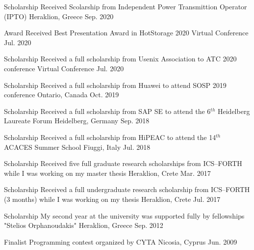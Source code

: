 \begin{cvhonors}
	\cvhonor
	{Scholarship} %
	{Received Scolarship from Independent Power Transmittion Operator
		(IPTO)} %
	{Heraklion, Greece} %
	{Sep. 2020} %

	\cvhonor
	{Award} %
	{Received Best Presentation Award in HotStorage 2020} %
	{Virtual Conference} %
	{Jul. 2020} %

	\cvhonor
	{Scholarship} %
	{Received a full scholarship from Usenix Association to ATC 2020
		conference} %
	{Virtual Conference} %
	{Jul. 2020} %

	\cvhonor
	{Scholarship} %
	{Received a full scholarship from Huawei to attend SOSP 2019
		conference} %
	{Ontario, Canada} %
	{Oct. 2019} %

	\cvhonor
	{Scholarship} %
	{Received a full scholarship from SAP SE to attend the 6$^{th}$
		Heidelberg Laureate Forum} %
	{Heidelberg, Germany} %
	{Sep. 2018} %

	\cvhonor
	{Scholarship} %
	{Received a full scholarship from HiPEAC to attend the 14$^{th}$
		ACACES Summer School} %
	{Fiuggi, Italy} %
	{Jul. 2018} %

	\cvhonor
	{Scholarship} %
	{Received five full graduate research scholarships from ICS--FORTH
		while I was working on my master thesis} %
	{Heraklion, Crete} %
	{Mar. 2017} %

	\cvhonor
	{Scholarship} %
	{Received a full undergraduate research scholarship from
		ICS--FORTH (3 months) while I was working on my thesis} %
	{Heraklion, Crete} %
	{Jul. 2017} %

	\cvhonor
	{Scholarship} %
	{My second year at the university was supported fully by
		fellowships "Stelios Orphanoudakis"} %
	{Heraklion, Greece} %
	{Sep. 2012} %

	\cvhonor
	{Finalist} %
	{Programming contest organized by CYTA} %
	{Nicosia, Cyprus} %
	{Jun. 2009} %

\end{cvhonors}

